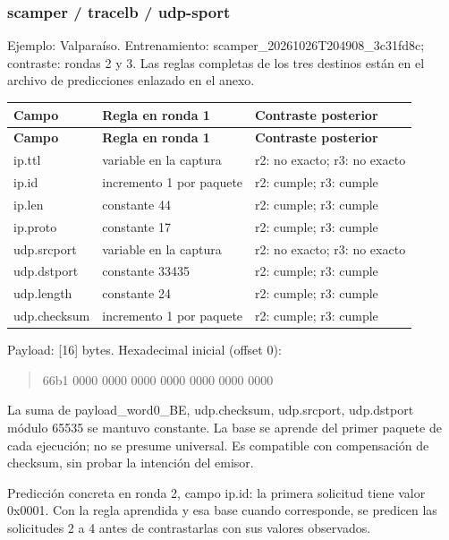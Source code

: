 \subsubsection{scamper / tracelb / udp-sport}
Ejemplo: Valparaíso. Entrenamiento: scamper\_\allowbreak{}20261026T204908\_\allowbreak{}3c31fd8c; contraste: rondas 2 y 3. Las reglas completas de los tres destinos están en el archivo de predicciones enlazado en el anexo.

\begingroup
\fontsize{9}{11}\selectfont
\addtocounter{table}{-1}
\begin{longtable}{p{3.1cm}p{5.8cm}p{5.1cm}}
\toprule
\textbf{Campo} & \textbf{Regla en ronda 1} & \textbf{Contraste posterior} \\ \midrule
\endfirsthead
\toprule
\textbf{Campo} & \textbf{Regla en ronda 1} & \textbf{Contraste posterior} \\ \midrule
\endhead
ip.ttl & variable en la captura & r2: no exacto; r3: no exacto \\
ip.id & incremento 1 por paquete & r2: cumple; r3: cumple \\
ip.len & constante 44 & r2: cumple; r3: cumple \\
ip.proto & constante 17 & r2: cumple; r3: cumple \\
udp.srcport & variable en la captura & r2: no exacto; r3: no exacto \\
udp.dstport & constante 33435 & r2: cumple; r3: cumple \\
udp.length & constante 24 & r2: cumple; r3: cumple \\
udp.checksum & incremento 1 por paquete & r2: cumple; r3: cumple \\
\bottomrule
\end{longtable}
\endgroup
Payload: [16] bytes. Hexadecimal inicial (offset 0):

\begin{quote}\ttfamily\footnotesize\raggedright 66b1 0000 0000 0000 0000 0000 0000 0000\end{quote}
La suma de payload\_\allowbreak{}word0\_\allowbreak{}BE, udp.checksum, udp.srcport, udp.dstport módulo 65535 se mantuvo constante. La base se aprende del primer paquete de cada ejecución; no se presume universal. Es compatible con compensación de checksum, sin probar la intención del emisor.

Predicción concreta en ronda 2, campo ip.id: la primera solicitud tiene valor 0x0001. Con la regla aprendida y esa base cuando corresponde, se predicen las solicitudes 2 a 4 antes de contrastarlas con sus valores observados.

